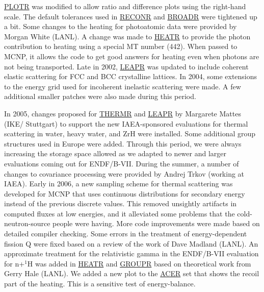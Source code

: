 \hyperlink{sPLOTRhy}{PLOTR} was modified
to allow ratio and difference plots using the right-hand scale.  The
default tolerances used in \hyperlink{sRECONRhy}{RECONR}
and \hyperlink{sBROADRhy}{BROADR} were tightened
up a bit.  Some changes to the heating for photoatomic data were
provided by Morgan White (LANL).  A change was made
to \hyperlink{sHEATRhy}{HEATR} to provide the photon
contribution to heating using a special MT number
(442).  When passed to
MCNP, it allows the code to get good answers for
heating even when photons are not being transported.  Late
in 2002, \hyperlink{sLEAPRhy}{LEAPR} was updated
to include coherent elastic scattering for FCC and BCC crystalline
lattices.  In 2004, some extensions to the energy grid used for
incoherent inelastic scattering were made.  A few additional
smaller patches were also made during this period.

In 2005, changes proposed for \hyperlink{sTHERMRhy}{THERMR}
 and \hyperlink{sLEAPRhy}{LEAPR}
by Margarete Mattes (IKE/ Stuttgart)
to support the new IAEA-sponsored evaluations for thermal scattering
in water, heavy water, and ZrH were installed.  Some additional
group structures used in Europe were added.  Through this period,
we were always increasing the storage space allowed as we adapted
to newer and larger evaluations coming out for ENDF/B-VII.
During the summer, a number of changes to covariance processing
were provided by Andrej Trkov (working at IAEA).  Early
in 2006, a new sampling scheme for thermal scattering was developed
for MCNP that uses continuous distributions for
secondary energy instead of the previous discrete values.  This
removed unsightly artifacts in computed fluxes at low energies, and
it alleviated some problems that the cold-neutron-source people were
having.  More code improvements were made based on detailed compiler
checking.  Some errors in the treatment of energy-dependent
fission Q were fixed based on a review of the work of Dave
Madland (LANL).  An approximate treatment for the
relativistic gamma in the ENDF/B-VII evaluation for n+$^1$H was added
in \hyperlink{sHEATRhy}{HEATR} and
\hyperlink{sGROUPRhy}{GROUPR}  based on theoretical
work from Gerry Hale (LANL).  We added a new plot to the
\hyperlink{sACERhy}{ACER} set that shows the recoil part
of the heating.  This is a sensitive test of energy-balance.

